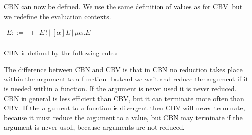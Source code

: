 CBN can now be defined.  We use the same definition of values as for CBV,
but we redefine the evaluation contexts.
\begin{center}
  \begin{math}
    \begin{array}{lll}
      E ::= \Box\,|\,E\,t\,|\,[\alpha]E\,|\,\mu \alpha.E\\
    \end{array}
  \end{math}
\end{center}
\begin{definition}
  \label{def:lamu_cbv}
  CBN is defined by the following rules:
  \begin{center}
  \end{center}
\end{definition}
\noindent
The difference between CBN and CBV is that in CBN no reduction takes
place within the argument to a function.  Instead we wait and reduce
the argument if it is needed within a function.  If the argument is
never used it is never reduced.  CBN in general is less efficient than
CBV, but it can terminate more often than CBV.  If the argument to a
function is divergent then CBV will never terminate, because it must
reduce the argument to a value, but CBN may terminate if the argument
is never used, because arguments are not reduced.

